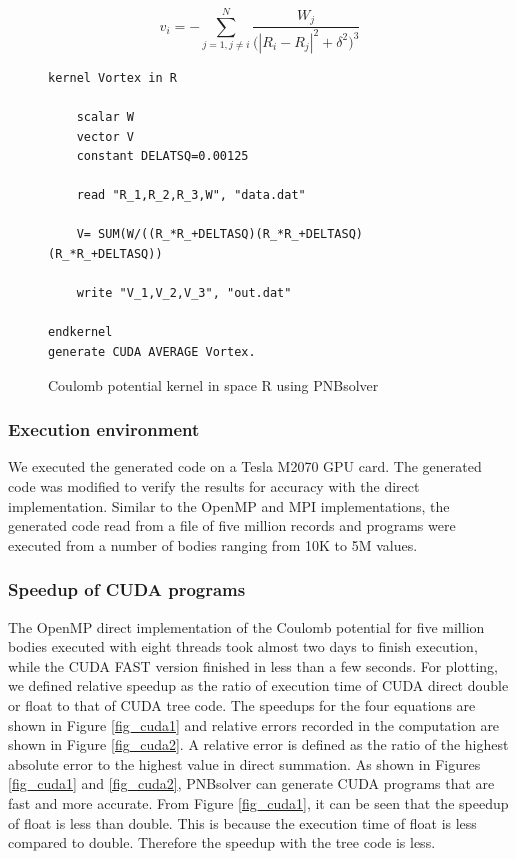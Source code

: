 \documentclass[draftclsnofoot]{elsarticle}
\begin{document}
\begin{equation}
\label{eqn_vortex}
v_i= -\sum \limits_{j=1, j\ne i}^{N} \frac{W_j}{{({|R_i- R_j|}^2+{\delta}^2})^3} 
\end{equation}
\begin{figure}[!t]
\centering
\begin{lstlisting}[style=AMMA, language=PNB]
kernel Vortex in R

	scalar W
	vector V
	constant DELATSQ=0.00125	

	read "R_1,R_2,R_3,W", "data.dat"

	V= SUM(W/((R_*R_+DELTASQ)(R_*R_+DELTASQ) (R_*R_+DELTASQ))

	write "V_1,V_2,V_3", "out.dat"
	
endkernel
generate CUDA AVERAGE Vortex. 
\end{lstlisting}
\caption{Coulomb potential kernel in space R using PNBsolver}
\label{fig_vortex}
\end{figure}

\subsubsection{Execution environment}
We executed the generated code on a Tesla M2070 GPU card. The generated code was modified to verify the results for accuracy with the direct implementation. Similar
to the OpenMP and MPI implementations, the generated code read from a file of five million records and programs were executed from a number of bodies ranging from 10K to
5M values. 


\subsubsection{Speedup of CUDA programs}
The OpenMP direct implementation of the Coulomb potential for five million bodies executed with eight threads took almost two days to finish execution, while the CUDA FAST
version finished in less than a few seconds. For plotting, we defined relative speedup as the ratio of execution time of CUDA direct double or float to that of CUDA tree code. The speedups
for the four equations are shown in Figure \ref{fig_cuda1} and relative errors recorded in the computation are shown in Figure \ref{fig_cuda2}. A relative error is defined
as the ratio of the highest absolute error to the highest value in direct summation. As shown in Figures \ref{fig_cuda1} and \ref{fig_cuda2}, PNBsolver can generate 
CUDA programs that are fast and more accurate. From Figure \ref{fig_cuda1}, it can be seen that the speedup of float is less than
double. This is because the execution time of float is less compared to double. Therefore  the speedup with the tree code is less. 
\end{document}
